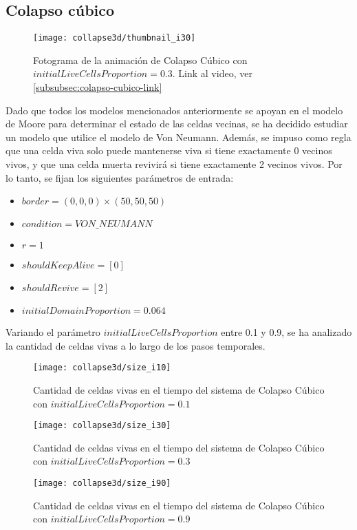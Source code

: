 \subsection{Colapso cúbico}\label{subsec:colapso-cubico}

\begin{figure}[H]
    \centering
    \texttt{[image: collapse3d/thumbnail\_i30]}
    \caption{Fotograma de la animación de Colapso Cúbico con $initialLiveCellsProportion = 0.3$. Link al video, ver \ref{subsubsec:colapso-cubico-link}}
    \label{fig:thumbnailcolapso3d_i50}
\end{figure}

Dado que todos los modelos mencionados anteriormente se apoyan en el modelo de Moore para determinar el estado
de las celdas vecinas, se ha decidido estudiar un modelo que utilice el modelo de Von Neumann.
Además, se impuso como regla que una celda viva solo puede mantenerse viva si tiene exactamente 0 vecinos vivos,
y que una celda muerta revivirá si tiene exactamente 2 vecinos vivos.
Por lo tanto, se fijan los siguientes parámetros de entrada:
\begin{itemize}
    \item $border = (0, 0, 0) \times (50, 50, 50)$
    \item $condition = VON\_NEUMANN$
    \item $r = 1$
    \item $shouldKeepAlive = [0]$
    \item $shouldRevive = [2]$
    \item $initialDomainProportion = 0.064$
\end{itemize}

Variando el parámetro $initialLiveCellsProportion$ entre 0.1 y 0.9, se ha analizado la cantidad de celdas vivas
a lo largo de los pasos temporales.

\begin{figure}[H]
    \centering
    \texttt{[image: collapse3d/size\_i10]}
    \caption{Cantidad de celdas vivas en el tiempo del sistema de Colapso Cúbico con $initialLiveCellsProportion = 0.1$}
    \label{fig:colapso3d_i10}
\end{figure}
\begin{figure}[H]
    \centering
    \texttt{[image: collapse3d/size\_i30]}
    \caption{Cantidad de celdas vivas en el tiempo del sistema de Colapso Cúbico con $initialLiveCellsProportion = 0.3$}
    \label{fig:colapso3d_i30}
\end{figure}
\begin{figure}[H]
    \centering
    \texttt{[image: collapse3d/size\_i90]}
    \caption{Cantidad de celdas vivas en el tiempo del sistema de Colapso Cúbico con $initialLiveCellsProportion = 0.9$}
    \label{fig:colapso3d_i90}
\end{figure}


